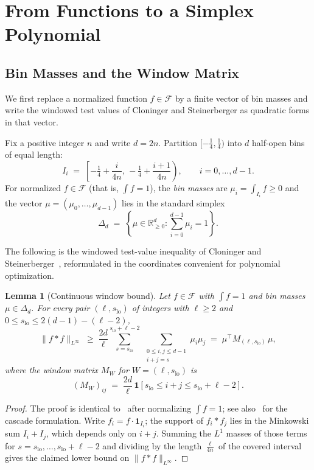 \documentclass[11pt, letterpaper]{article}
\theoremstyle{paperplain}
\newtheorem{lemma}[theorem]{Lemma}
\theoremstyle{paperdef}
\newcommand{\R}{\mathbb{R}}
\begin{document}
\section{From Functions to a Simplex Polynomial}\label{sec:reduction}

\subsection{Bin Masses and the Window Matrix}

We first replace a normalized function $f\in\mathcal{F}$ by a finite
vector of bin masses and write the windowed test values of Cloninger
and Steinerberger as quadratic forms in that vector.

Fix a positive integer $n$ and write $d=2n$.  Partition
$[-\tfrac14,\tfrac14)$ into $d$ half-open bins of equal length:
\[
  I_i
  \;=\;
  \left[-\tfrac14 + \frac{i}{4n},\,
        -\tfrac14 + \frac{i+1}{4n}\right),
  \qquad i=0,\dots,d-1.
\]
For normalized $f\in\mathcal{F}$ (that is, $\int f=1$), the
\emph{bin masses} are $\mu_i = \int_{I_i} f \ge 0$ and the vector
$\mu=(\mu_0,\ldots,\mu_{d-1})$ lies in the standard simplex
\[
  \Delta_d \;=\; \left\{\mu \in \R_{\ge 0}^d : \sum_{i=0}^{d-1}\mu_i = 1\right\}.
\]

The following is the windowed test-value inequality of Cloninger and
Steinerberger~\cite[Lemma~1]{CS17}, reformulated in the coordinates
convenient for polynomial optimization.

\begin{lemma}[Continuous window bound]
\label{lem:continuous-window}
Let $f\in\mathcal{F}$ with $\int f=1$ and bin masses
$\mu\in\Delta_d$.  For every pair $(\ell,s_{\mathrm{lo}})$ of
integers with $\ell\ge 2$ and $0\le s_{\mathrm{lo}}\le 2(d-1)-(\ell-2)$,
\[
  \|f*f\|_{L^\infty}
  \;\ge\;
  \frac{2d}{\ell}
  \sum_{s=s_{\mathrm{lo}}}^{s_{\mathrm{lo}}+\ell-2}
  \ \sum_{\substack{0\le i,j\le d-1\\ i+j=s}}
  \mu_i\mu_j
  \;=\;
  \mu^\top M_{(\ell,s_{\mathrm{lo}})}\, \mu,
\]
where the window matrix $M_W$ for $W=(\ell,s_{\mathrm{lo}})$ is
\[
  (M_W)_{ij}
  \;=\;
  \frac{2d}{\ell}\,
  \mathbf{1}\!\left[s_{\mathrm{lo}}\le i+j\le s_{\mathrm{lo}}+\ell-2\right].
\]
\end{lemma}

\begin{proof}
The proof is identical to~\cite[Lemma~1]{CS17} after normalizing
$\int f = 1$; see also~\cite[Lemma~2.3]{BajajCS2026} for the
cascade formulation.  Write $f_i=f\cdot\mathbf{1}_{I_i}$; the support of $f_i*f_j$ lies in the
Minkowski sum $I_i+I_j$, which depends only on $i+j$.  Summing the
$L^1$ masses of those terms for $s=s_{\mathrm{lo}},\ldots,s_{\mathrm{lo}}+\ell-2$
and dividing by the length $\tfrac{\ell}{4n}$ of the covered interval
gives the claimed lower bound on $\|f*f\|_{L^\infty}$.
\end{proof}
\end{document}
